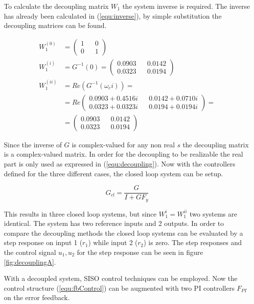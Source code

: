 \documentclass[a4paper, titlepage]{article}
\begin{document}
To calculate the decoupling matrix $W_1$ the system inverse is required.
The inverse has already been calculated in (\ref{equ:inverse}), by simple substitution the decoupling matrices can be found.

\begin{equation}
\begin{split}
W^{(0)}_1 &= 
\begin{pmatrix}
1 && 0 \\ 0 && 1
\end{pmatrix} \\
W^{(i)}_1 &= G^{-1}(0) = 
\begin{pmatrix}
0.0903 && 0.0142 \\ 0.0323 && 0.0194
\end{pmatrix} \\
W^{(ii)}_1 &= Re(G^{-1}(\omega_ci)) = \\
&=
Re\begin{pmatrix}
0.0903 + 0.4516i && 0.0142 + 0.0710i \\
0.0323 + 0.0323i && 0.0194 + 0.0194i
\end{pmatrix} = \\
&= 
\begin{pmatrix}
0.0903 && 0.0142 \\ 0.0323 && 0.0194
\end{pmatrix}
\end{split}
\label{equ:decoupling}
\end{equation}

Since the inverse of $G$ is complex-valued for any non real $s$ the decoupling matrix is a complex-valued matrix.
In order for the decoupling to be realizable the real part is only used as expressed in (\ref{equ:decoupling}).
Now with the controllers defined for the three different cases, the closed loop system can be setup.

\begin{equation}
G_{cl} = \frac{G}{I+GF_y}
\label{equ:closedLoopDecoup}
\end{equation}

This results in three closed loop systems, but since $W^{i}_1 = W^{ii}_1$ two systems are identical.
The system has two reference inputs and 2 outputs.
In order to compare the decoupling methods the closed loop systems can be evaluated by a step response on input 1 ($r_1$) while input 2 ($r_2$) is zero.
The step responses and the control signal $u_1, u_2$ for the step response can be seen in figure \ref{fig:decouplingA}.

With a decoupled system, SISO control techniques can be employed.
Now the control structure (\ref{equ:fbControl}) can be augmented with two PI controllers $F_{PI}$ on the error feedback.
\end{document}
